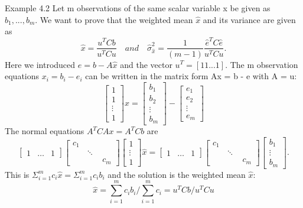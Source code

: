 	Example 4.2\; Let m observations of the same scalar variable x be given as $b_1,...,b_m$. We
	want to prove that the weighted mean $\hat{x}$ and its variance are given as
	\begin{equation}
	\hat{x}=\frac{u^TCb}{u^TCu} 
	\quad and \quad 
    \hat{\sigma}^{2}_{\hat{x}}=\frac{1}{(m-1)}\frac{\hat{e}^TC\hat{e}}{u^TCu}.
	\end{equation}
	Here we introduced $\hat{e}=b-A\hat{x}$ and the vector $u^T=[1 1 ... 1]$. The m observation
	equations $x_i=b_i-e_i$ can be written in the matrix form Ax = b - e with A = u:
	\begin{equation*}
	\begin{bmatrix}
	1 \\ 1 \\ \vdots \\1
	\end{bmatrix}
	x=
	\begin{bmatrix}
	b_1 \\ b_2 \\ \vdots \\ b_m
	\end{bmatrix}
	-
	\begin{bmatrix}
	e_1 \\ e_2 \\ \vdots \\ e_m
	\end{bmatrix}
	\end{equation*}
	The normal equations $A^TCAx=A^TCb$ are
	\begin{equation*}
	\begin{bmatrix}
	1 & \dots & 1
	\end{bmatrix}
	\begin{bmatrix}
	c_1 & \quad  &\quad \\
	\quad & \ddots & \quad \\
	\quad & \quad  & c_m
	\end{bmatrix}
	\begin{bmatrix}
	1 \\ \vdots \\ 1
	\end{bmatrix}
	\hat{x}=
	\begin{bmatrix}
	1 & \dots & 1
	\end{bmatrix}
	\begin{bmatrix}
	c_1 & \quad  &\quad \\
	\quad & \ddots & \quad \\
	\quad & \quad  & c_m
	\end{bmatrix}
	\begin{bmatrix}
	b_1 \\ \vdots \\ b_m
	\end{bmatrix}.
	\end{equation*}
	This is $\Sigma^{m}_{i=1}c_i\hat{x}=\Sigma^{m}_{i=1}c_ib_i$ and the solution is the weighted mean $\hat{x}$:
	\begin{equation}
	\hat{x}=\sum_{i=1}^{m}c_ib_i / \sum_{i=1}^{m}c_i=u^TCb/u^TCu
	\end{equation} 
	
